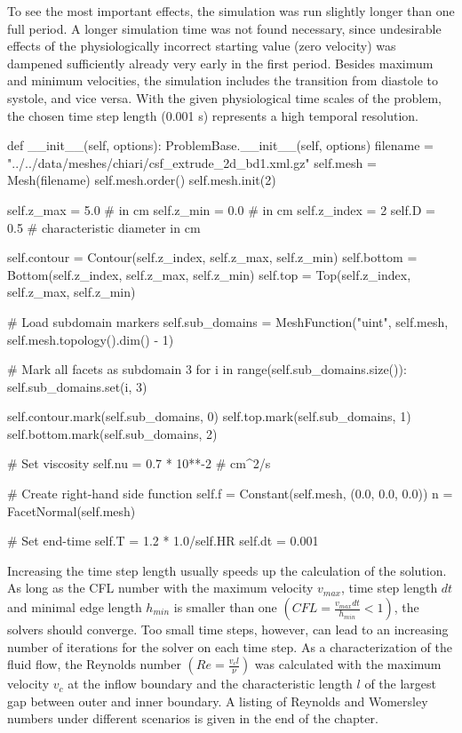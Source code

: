 To see the most important effects, the simulation was run slightly
longer than one full period. A longer simulation time was not found
necessary, since undesirable effects of the physiologically incorrect
starting value (zero velocity) was dampened sufficiently already very
early in the first period. Besides maximum and minimum velocities, the
simulation includes the transition from diastole to systole, and vice
versa.  With the given physiological time scales of the problem, the
chosen time step length (0.001 s) represents a high temporal
resolution.
\begin{python}
def __init__(self, options):
	ProblemBase.__init__(self, options)
	filename = "../../data/meshes/chiari/csf_extrude_2d_bd1.xml.gz"
	self.mesh = Mesh(filename)
	self.mesh.order()
	self.mesh.init(2)

	self.z_max = 5.0	# in cm
	self.z_min = 0.0	# in cm
	self.z_index = 2
	self.D = 0.5 		# characteristic diameter in cm

	self.contour = Contour(self.z_index, self.z_max, self.z_min)
	self.bottom = Bottom(self.z_index, self.z_max, self.z_min)
	self.top = Top(self.z_index, self.z_max, self.z_min)

	# Load subdomain markers
	self.sub_domains = MeshFunction("uint", self.mesh, self.mesh.topology().dim() - 1)

	# Mark all facets as subdomain 3
	for i in range(self.sub_domains.size()):
		self.sub_domains.set(i, 3)

	self.contour.mark(self.sub_domains, 0)
	self.top.mark(self.sub_domains, 1)
	self.bottom.mark(self.sub_domains, 2)

	# Set viscosity
	self.nu = 0.7 * 10**-2 # cm^2/s

	# Create right-hand side function
	self.f = Constant(self.mesh, (0.0, 0.0, 0.0))
	n = FacetNormal(self.mesh)

	# Set end-time
	self.T = 1.2 * 1.0/self.HR
	self.dt = 0.001
\end{python}

Increasing the time step length usually speeds up the calculation of
the solution. As long as the CFL number with the maximum velocity
$v_{max}$, time step length $dt$ and minimal edge length $h_{min}$ is
smaller than one $(CFL = \frac{v_{max} dt}{h_{min}} < 1)$, the solvers
should converge. Too small time steps, however, can lead to an
increasing number of iterations for the solver on each time step.  As
a characterization of the fluid flow, the Reynolds number $(Re =
\frac{v_c l}{\nu})$ was calculated with the maximum velocity $v_c$ at
the inflow boundary and the characteristic length $l$ of the largest
gap between outer and inner boundary. A listing of Reynolds and Womersley numbers
under different scenarios is given in the end of the chapter.  



